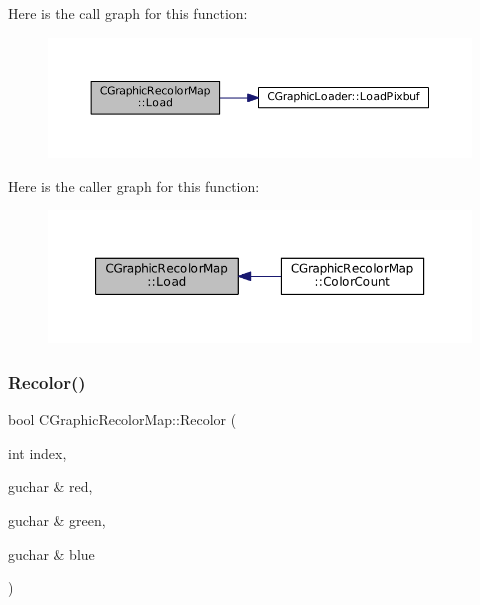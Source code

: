 Here is the call graph for this function\+:\nopagebreak
\begin{figure}[H]
\begin{center}
\leavevmode
\includegraphics[width=350pt]{classCGraphicRecolorMap_a71b26547c2e943036278611d048afdfb_cgraph}
\end{center}
\end{figure}
Here is the caller graph for this function\+:\nopagebreak
\begin{figure}[H]
\begin{center}
\leavevmode
\includegraphics[width=350pt]{classCGraphicRecolorMap_a71b26547c2e943036278611d048afdfb_icgraph}
\end{center}
\end{figure}
\hypertarget{classCGraphicRecolorMap_a338087373145b89a29902b50276358d1}{}\label{classCGraphicRecolorMap_a338087373145b89a29902b50276358d1} 
\subsubsection{\texorpdfstring{Recolor()}{Recolor()}}
{\footnotesize\ttfamily bool C\+Graphic\+Recolor\+Map\+::\+Recolor (\begin{DoxyParamCaption}\item[{int}]{index,  }\item[{guchar \&}]{red,  }\item[{guchar \&}]{green,  }\item[{guchar \&}]{blue }\end{DoxyParamCaption})}



